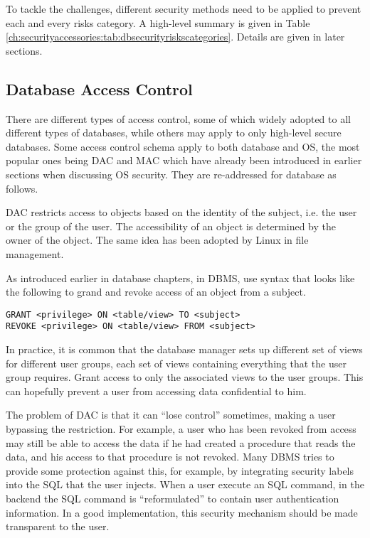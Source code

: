 To tackle the challenges, different security methods need to be applied to prevent each and every risks category. A high-level summary is given in Table \ref{ch:securityaccessories:tab:dbsecurityriskscategories}. Details are given in later sections.

\subsection{Database Access Control}

There are different types of access control, some of which widely adopted to all different types of databases, while others may apply to only high-level secure databases. Some access control schema apply to both database and OS, the most popular ones being DAC and MAC which have already been introduced in earlier sections when discussing OS security. They are re-addressed for database as follows.

DAC restricts access to objects based on the identity of the subject, i.e. the user or the group of the user. The accessibility of an object is determined by the owner of the object. The same idea has been adopted by Linux in file management.

As introduced earlier in database chapters, in DBMS, use syntax that looks like the following to grand and revoke access of an object from a subject.
\begin{lstlisting}
GRANT <privilege> ON <table/view> TO <subject>
REVOKE <privilege> ON <table/view> FROM <subject>
\end{lstlisting}
In practice, it is common that the database manager sets up different set of views for different user groups, each set of views containing everything that the user group requires. Grant access to only the associated views to the user groups. This can hopefully prevent a user from accessing data confidential to him.

The problem of DAC is that it can ``lose control'' sometimes, making a user bypassing the restriction. For example, a user who has been revoked from access may still be able to access the data if he had created a procedure that reads the data, and his access to that procedure is not revoked. Many DBMS tries to provide some protection against this, for example, by integrating security labels into the SQL that the user injects. When a user execute an SQL command, in the backend the SQL command is ``reformulated'' to contain user authentication information. In a good implementation, this security mechanism should be made transparent to the user.

